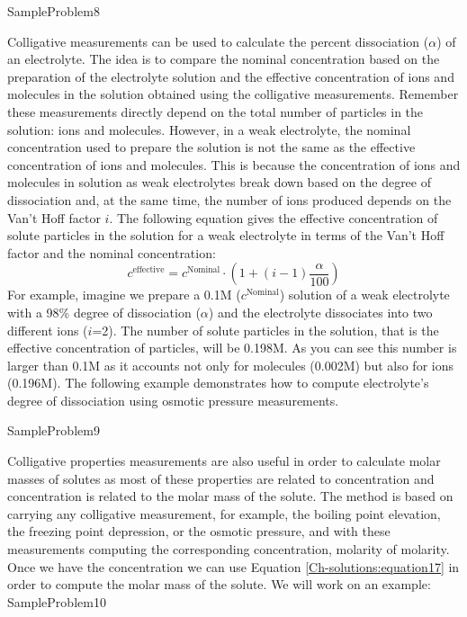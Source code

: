 \documentclass[main.tex]{subfiles}
\newcommand\chapterlabel{Ch-solutions}\setcounter{figurenewcounter}{0}\setcounter{tablenewcounter}{0}\setcounter{formulanewcounter}{0}
\begin{document}
\begin{description}
{SampleProblem8}



\item[\docfilehook{Use of colligative properties to calculate $\alpha$}{}] 
Colligative measurements can be used to calculate the percent dissociation ($\alpha$) of an electrolyte. The idea is to compare the nominal concentration based on the preparation of the electrolyte solution and the effective concentration of ions and molecules in the solution obtained using the colligative measurements. Remember these measurements directly depend on the total number of particles in the solution: ions and molecules.  However, in a weak electrolyte, the nominal concentration used to prepare the solution is not the same as the effective concentration of ions and molecules. This is because the concentration of ions and molecules in solution as weak electrolytes break down based on the degree of dissociation and, at the same time, the number of ions produced depends on the Van't Hoff factor $i$. The following equation gives the effective concentration of solute particles in the solution for a weak electrolyte in terms of the Van't Hoff factor and the nominal concentration:
\[ c^{\text{effective}}=c^{\text{Nominal}}\cdot (1+ (i-1)\frac{\alpha}{100}) \]
For example, imagine we prepare a 0.1M ($c^{\text{Nominal}}$) solution of a weak electrolyte with a 98\% degree of dissociation ($\alpha$) and the electrolyte dissociates into two different ions ($i$=2). The number of solute particles in the solution, that is the effective concentration of particles, will be 0.198M. As you can see this number is larger than 0.1M as it accounts not only for molecules (0.002M) but also for ions (0.196M).
The following example demonstrates how to compute electrolyte's degree of dissociation using osmotic pressure measurements.

{SampleProblem9}

  


\item[\docfilehook{Use of colligative properties to calculate $MW$}{}] 
Colligative properties measurements are also useful in order to calculate molar masses of solutes as most of these properties are related to concentration and concentration is related to the molar mass of the solute. The method is based on carrying any colligative measurement, for example, the boiling point elevation, the freezing point depression, or the osmotic pressure, and with these measurements computing the corresponding concentration, molarity of molarity. Once we have the concentration we can use Equation \ref{\chapterlabel:equation17} in order to compute the molar mass of the solute. We will work on an example:
{SampleProblem10}

    
    
    
    
\end{description}
\end{document}
